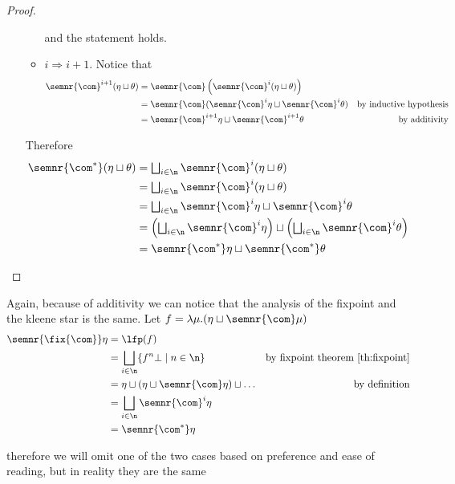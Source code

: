 \begin{proof}
\begin{itemize}
\begin{itemize}
\begin{equation*}
      \end{equation*}
      and the statement holds.
    \item \(i \Rightarrow i + 1\). Notice that
      \begin{align*}
        \semnr{\com}^{i+1}(\eta \sqcup \theta) & = \semnr{\com}\left(\semnr{\com}^i(\eta \sqcup \theta)\right) \\
                                               & = \semnr{\com}(\semnr{\com}^i\eta \sqcup \semnr{\com}^i\theta) & \text{by inductive hypothesis} \\
        & = \semnr{\com}^{i+1}\eta \sqcup \semnr{\com}^{i+1}\theta & \text{by additivity}
      \end{align*}
    \end{itemize}
    Therefore
    \begin{align*}
      \semnr{\com^*}(\eta\sqcup\theta) & = \textstyle \bigsqcup_{i\in\n} \semnr{\com}^i(\eta \sqcup \theta) \\
                                       & = \textstyle \bigsqcup_{i\in\n}\semnr{\com}^i(\eta \sqcup \theta) \\
                                       & = \textstyle \bigsqcup_{i\in\n}\semnr{\com}^i\eta \sqcup \semnr{\com}^i\theta \\
                                       & = \left(\textstyle \bigsqcup_{i\in\n} \semnr{\com}^i\eta\right) \sqcup \left(\textstyle \bigsqcup_{i\in\n} \semnr{\com}^i\theta\right) \\
      & = \semnr{\com^*} \eta \sqcup \semnr{\com^*}\theta
    \end{align*}
  \end{itemize}
\end{proof}

Again, because of additivity we can notice that the analysis of the
fixpoint and the kleene star is the same. Let
\(f = \lambda \mu . (\eta \sqcup \semnr{\com}\mu)\)
\begin{align*}
  \semnr{\fix{\com}}\eta & = \lfp(f) \\
                         & = \bigsqcup_{i\in\n}\{f^n\bot \mid n \in \n\} & \text{by fixpoint theorem \ref{th:fixpoint}}\\
                         & = \eta \sqcup (\eta \sqcup \semnr{\com}\eta) \sqcup \dots & \text{by definition}\\
                         & = \bigsqcup_{i\in\n}\semnr{\com}^i\eta \\
                         & = \semnr{\com^*}\eta
\end{align*}

therefore we will omit one of the two cases based on preference and
ease of reading, but in reality they are the same

